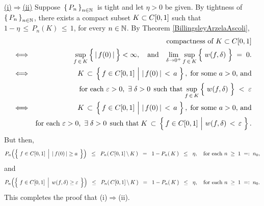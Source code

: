 \proof
\vskip 0.2cm
\noindent
\underline{(i)\;$\Longrightarrow$\;(ii)}
\vskip 0.2cm
\noindent
Suppose \,$\left\{\,P_{n}\,\right\}_{n\in\mathbb{N}}$\, is tight and let $\eta > 0$ be given.
By tightness of $\left\{\,P_{n}\,\right\}_{n\in\mathbb{N}}$, there exists a compact subset $K \subset C[0,1]$
such that \,$1 - \eta \,\leq\, P_{n}\!\left(K\right) \,\leq\, 1$, for every $n \in \mathbb{N}$.
By Theorem \ref{BillingsleyArzelaAscoli},
\begin{eqnarray*}
&&
	\textnormal{compactness of $K \subset \Czo$}
\\
&\Longleftrightarrow&
	\underset{f\,\in\,K}{\sup}\left\{\,\vert\,\overset{{\color{white}.}}{f}(0)\,\vert\,\right\} < \infty,
	\quad\textnormal{and}\quad
	\underset{\delta\rightarrow 0^{+}}{\lim}\,\underset{f\,\in\,K}{\sup}\left\{\;\overset{{\color{white}:}}{w}(f,\delta)\;\right\}\;=\;0.
\\
&\Longleftrightarrow&
	K\,\subset\,
	\left\{\,
		f \in \Czo
		\,\left\vert\,\, \vert\,f(0)\,\vert\,\overset{{\color{white}.}}{<}\,a\right.
	\,\right\},
	\;\textnormal{for some $a > 0$, and}
\\
&&
	\textnormal{for each $\varepsilon > 0$, \,$\exists$\;$\delta > 0$\;\,such that}\;
	\underset{f\,\in\,K}{\sup}\left\{\;\overset{{\color{white}:}}{w}(f,\delta)\;\right\}
	\;<\;\varepsilon
\\
&\Longleftrightarrow&
	K\,\subset\,
	\left\{\,
		f \in \Czo
		\,\left\vert\,\, \vert\,f(0)\,\vert\,\overset{{\color{white}.}}{<}\,a\right.
	\,\right\},
	\;\textnormal{for some $a > 0$, and}
\\
&&
	\textnormal{for each $\varepsilon > 0$, \,$\exists$\;$\delta > 0$\;\,such that}\;
	K\,\subset\,
	\left\{\,
		f \in \Czo
		\,\left\vert\,\, w(f,\delta)\,\overset{{\color{white}.}}{<}\,\varepsilon\right.
	\,\right\}.
\end{eqnarray*}
But then,
\begin{equation*}
	P_{n}\!\left(\left\{\;
		f \in \Czo
		\;\left\vert\;\,
		\vert\,f(0)\,\vert \overset{{\color{white}.}}{\geq} a
		\right.
	\;\right\}\right)
	\;\;\leq\;\; P_{n}\!\left(\,\Czo\,\backslash\,K\,\right)
	\;\; = \;\; 1 - P_{n}\!\left(\,K\,\right)
	\;\;\leq\;\; \eta,
	\quad
	\textnormal{for each $n \;\geq\; 1 \;=:\; n_{0}$},
\end{equation*}
and
\begin{equation*}
	P_{n}\!\left(\left\{\;
		f \in \Czo
		\;\left\vert\;\,
		w(f,\delta) \overset{{\color{white}.}}{\geq} \varepsilon
		\right.
	\;\right\}\right)
	\;\;\leq\;\; P_{n}\!\left(\,\Czo\,\backslash\,K\,\right)
	\;\; = \;\; 1 - P_{n}\!\left(\,K\,\right)
	\;\;\leq\;\; \eta,
	\quad
	\textnormal{for each $n \;\geq\; 1 \;=:\; n_{0}$}.
\end{equation*}
This completes the proof that (i)\;$\Longrightarrow$\;(ii).

